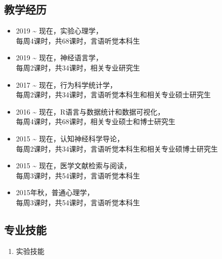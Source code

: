 \documentclass[
  12pt,
]{article}
\providecommand{\tightlist}{%
  \setlength{\itemsep}{0pt}\setlength{\parskip}{0pt}}
\begin{document}
\hypertarget{ux6559ux5b66ux7ecfux5386}{%
\subsection{教学经历}\label{ux6559ux5b66ux7ecfux5386}}

\begin{itemize}
\item
  2019 \textasciitilde{} 现在，实验心理学，\\
  每周4课时，共68课时，言语听觉本科生
\item
  2019 \textasciitilde{} 现在，神经语言学，\\
  每周2课时，共34课时，相关专业研究生
\item
  2017 \textasciitilde{} 现在，行为科学统计学，\\
  每周2课时，共34课时，言语听觉本科生和相关专业硕士研究生
\item
  2016 \textasciitilde{} 现在，R语言与数据统计和数据可视化，\\
  每周4课时，共68课时，相关专业硕士和博士研究生
\item
  2015 \textasciitilde{} 现在，认知神经科学导论，\\
  每周2课时，共34课时，言语听觉本科生和相关专业硕博士研究生
\item
  2015 \textasciitilde{} 现在，医学文献检索与阅读，\\
  每周3课时，共54课时，言语听觉本科生
\item
  2015年秋，普通心理学，\\
  每周3课时，共54课时，言语听觉本科生
\end{itemize}

\hypertarget{ux4e13ux4e1aux6280ux80fd}{%
\subsection{专业技能}\label{ux4e13ux4e1aux6280ux80fd}}

\begin{enumerate}
\def\labelenumi{\arabic{enumi}.}
\tightlist
\item
  实验技能
\end{enumerate}
\end{document}
